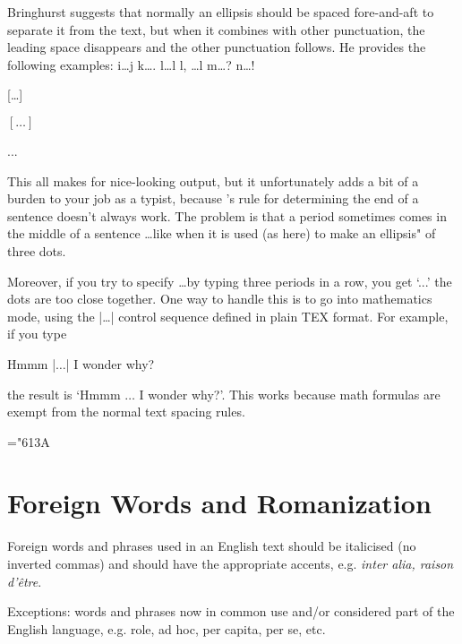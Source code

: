 Bringhurst suggests that normally an ellipsis should be spaced fore-and-aft to separate it from the text, but when it combines with other punctuation, the leading space disappears and the other punctuation follows. He provides the following examples:
i\ldots j	k\ldots.	l\ldots l	l, \ldots l	m\ldots?	n\ldots!

[\dots]\lorem

$[\ldots]$\lorem

...\lorem



This all makes for nice-looking output, but it unfortunately adds a bit
of a burden to your job as a typist, because \tex's rule for determining the end of
a sentence doesn't always work. The problem is that a period sometimes comes
in the middle of a sentence \dots like when it is used (as here) to make an ellipsis" of three dots.

Moreover, if you try to specify \ldots by typing three periods in a row,
you get `...' the dots are too close together. One way to handle this is to go
into mathematics mode, using the |\ldots| control sequence defined in plain TEX
format. For example, if you type

Hmmm |$\ldots$| I wonder why?

the result is `Hmmm $\ldots$ I wonder why?'. This works because math formulas are
exempt from the normal text spacing rules.


\begin{teXXX}
\mathchardef\ldotp="613A %
\def\ldots{\mathinner{\ldotp\ldotp\ldotp}}
\end{teXXX}




\section{Foreign Words and Romanization}

Foreign words and phrases used in an English text should be italicised (no
inverted commas) and should have the appropriate accents, e.g. \textit{inter alia,
raison d'\^{e}tre}.

Exceptions: words and phrases now in common use and/or considered part of
the English language, e.g. role, ad hoc, per capita, per se, etc.


